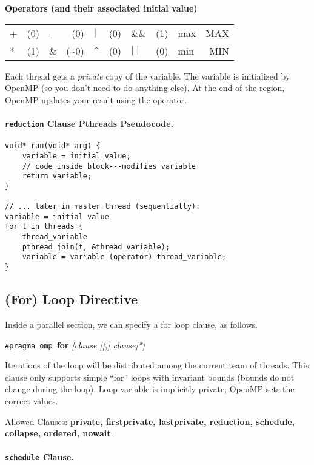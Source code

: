 {\bf Operators (and their associated initial value)}
  \begin{center}
    \begin{tabular}{l r | l r | l r | l r | l r}
      + & (0) & -  &  (0) &    $\mid$ & (0) & \&\& & (1) & max & MAX\\
      * & (1) & \& & (\~{}0) & \^{} & (0) &   $\mid\mid$ & (0) & min & MIN\\ 
    \end{tabular}
  \end{center}

Each thread gets a \emph{private} copy of the variable.
The variable is initialized by OpenMP (so you don't need to do anything else).
At the end of the region, OpenMP updates your result using the operator.

\paragraph{{\tt reduction} Clause Pthreads Pseudocode.}
  \begin{lstlisting}
void* run(void* arg) {
    variable = initial value;
    // code inside block---modifies variable
    return variable;
}

// ... later in master thread (sequentially):
variable = initial value
for t in threads {
    thread_variable
    pthread_join(t, &thread_variable);
    variable = variable (operator) thread_variable;
}
  \end{lstlisting}
\newpage
\subsection*{(For) Loop Directive} Inside a parallel section, we can
specify a for loop clause, as follows.

  \begin{center}
    {\tt \#pragma omp }{\bf for} {\it [clause [[,] clause]*]}
  \end{center}

    Iterations of the loop will be distributed among the
      current team of threads.
    This clause only supports simple ``for'' loops with invariant bounds (bounds do
      not change during the loop).
    Loop variable is implicitly private; OpenMP sets the
      correct values.

  Allowed Clauses: {\bf private, firstprivate, lastprivate, reduction, schedule,
    collapse, ordered, nowait}.

\paragraph{{\tt schedule} Clause.}


